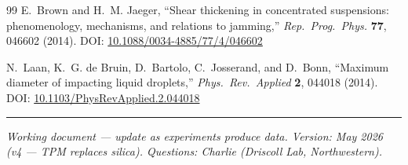 \documentclass[11pt,letterpaper]{article}
\begin{document}
\begin{thebibliography}{99}
  E.~Brown and H.~M. Jaeger,
  ``Shear thickening in concentrated suspensions: phenomenology, mechanisms,
  and relations to jamming,''
  \textit{Rep.\ Prog.\ Phys.} \textbf{77}, 046602 (2014).
  DOI: \href{https://doi.org/10.1088/0034-4885/77/4/046602}{10.1088/0034-4885/77/4/046602}

  N.~Laan, K.~G. de Bruin, D.~Bartolo, C.~Josserand, and D.~Bonn,
  ``Maximum diameter of impacting liquid droplets,''
  \textit{Phys.\ Rev.\ Applied} \textbf{2}, 044018 (2014).
  DOI: \href{https://doi.org/10.1103/PhysRevApplied.2.044018}{10.1103/PhysRevApplied.2.044018}

\end{thebibliography}

\vspace{20pt}
\noindent\rule{\linewidth}{0.4pt}
{\small\textit{Working document --- update as experiments produce data.
Version: May 2026 (v4 --- TPM replaces silica). Questions: Charlie (Driscoll Lab, Northwestern).}}
\end{document}
